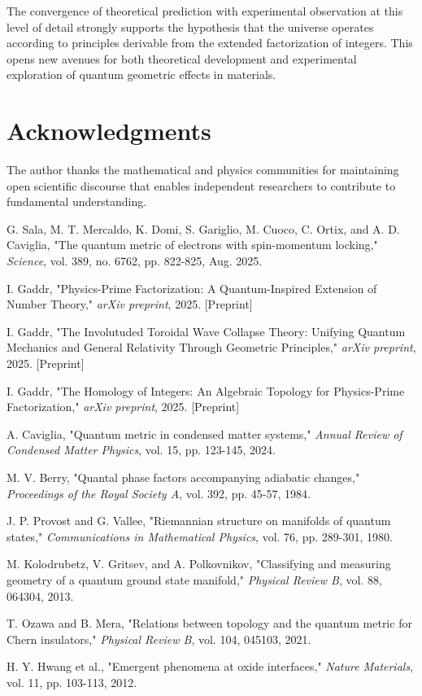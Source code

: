 \documentclass[conference]{IEEEtran}
\begin{document}
The convergence of theoretical prediction with experimental observation at this level of detail strongly supports the hypothesis that the universe operates according to principles derivable from the extended factorization of integers. This opens new avenues for both theoretical development and experimental exploration of quantum geometric effects in materials.

\section*{Acknowledgments}

The author thanks the mathematical and physics communities for maintaining open scientific discourse that enables independent researchers to contribute to fundamental understanding.

\begin{thebibliography}{1}

G. Sala, M. T. Mercaldo, K. Domi, S. Gariglio, M. Cuoco, C. Ortix, and A. D. Caviglia, "The quantum metric of electrons with spin-momentum locking," \emph{Science}, vol. 389, no. 6762, pp. 822-825, Aug. 2025.

I. Gaddr, "Physics-Prime Factorization: A Quantum-Inspired Extension of Number Theory," \emph{arXiv preprint}, 2025. [Preprint]

I. Gaddr, "The Involutuded Toroidal Wave Collapse Theory: Unifying Quantum Mechanics and General Relativity Through Geometric Principles," \emph{arXiv preprint}, 2025. [Preprint]

I. Gaddr, "The Homology of Integers: An Algebraic Topology for Physics-Prime Factorization," \emph{arXiv preprint}, 2025. [Preprint]

A. Caviglia, "Quantum metric in condensed matter systems," \emph{Annual Review of Condensed Matter Physics}, vol. 15, pp. 123-145, 2024.

M. V. Berry, "Quantal phase factors accompanying adiabatic changes," \emph{Proceedings of the Royal Society A}, vol. 392, pp. 45-57, 1984.

J. P. Provost and G. Vallee, "Riemannian structure on manifolds of quantum states," \emph{Communications in Mathematical Physics}, vol. 76, pp. 289-301, 1980.

M. Kolodrubetz, V. Gritsev, and A. Polkovnikov, "Classifying and measuring geometry of a quantum ground state manifold," \emph{Physical Review B}, vol. 88, 064304, 2013.

T. Ozawa and B. Mera, "Relations between topology and the quantum metric for Chern insulators," \emph{Physical Review B}, vol. 104, 045103, 2021.

H. Y. Hwang et al., "Emergent phenomena at oxide interfaces," \emph{Nature Materials}, vol. 11, pp. 103-113, 2012.

\end{thebibliography}
\end{document}
